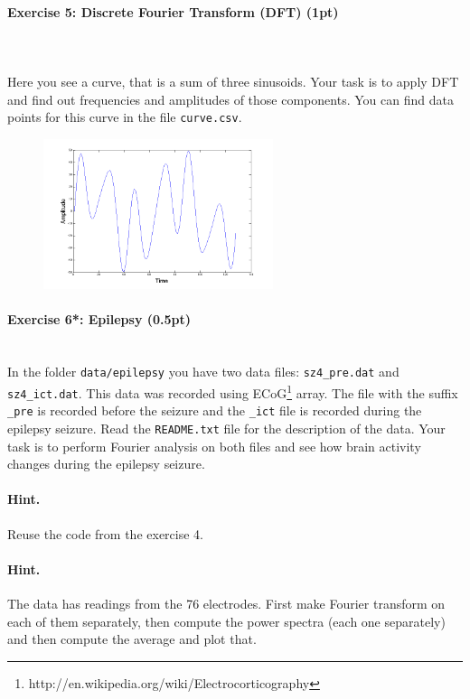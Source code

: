 \documentclass[a4paper,11pt]{article}
\newenvironment{exercise}[3]{\paragraph{Exercise #1: #2 (#3pt)}\ \\}{
\medskip}
\begin{document}
\begin{exercise}{5}{Discrete Fourier Transform (DFT)}{1}
\ \\
Here you see a curve, that is a sum of three sinusoids. Your task is to apply DFT and find out frequencies and amplitudes of those components. You can find data points for this curve in the file \texttt{curve.csv}.
\begin{figure}[htbp]
   \centering
   \includegraphics[width=0.6\textwidth]{dodft.png} 
\end{figure}
\end{exercise}


%
%
\begin{exercise}{6*}{Epilepsy}{0.5}
In the folder \texttt{data/epilepsy} you have two data files: \texttt{sz4\_pre.dat} and \texttt{sz4\_ict.dat}. This data was recorded using ECoG\footnote{http://en.wikipedia.org/wiki/Electrocorticography} array. The file with the suffix \texttt{\_pre} is recorded before the seizure and the \texttt{\_ict} file is recorded during the epilepsy seizure. Read the \texttt{README.txt} file for the description of the data. Your task is to perform Fourier analysis on both files and see how brain activity changes during the epilepsy seizure.
\paragraph{Hint.} Reuse the code from the exercise 4.
\paragraph{Hint.} The data has readings from the 76 electrodes. First make Fourier transform on each of them separately, then compute the power spectra (each one separately) and then compute the average and plot that.
\end{exercise}
\end{document}
